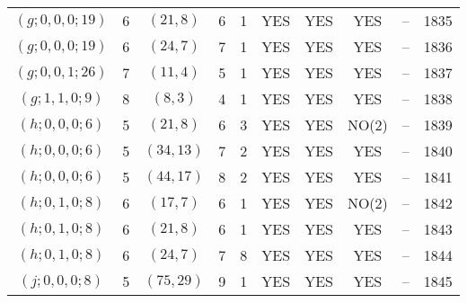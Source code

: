 \begin{longtable}{|c|c|c|c|c|c|c|c|c|c|}
$(g; 0, 0, 0; 19)$ & 6 & $(21, 8)$ & 6 & 1 & YES & YES & YES & -- & 1835\\
$(g; 0, 0, 0; 19)$ & 6 & $(24, 7)$ & 7 & 1 & YES & YES & YES & -- & 1836\\
$(g; 0, 0, 1; 26)$ & 7 & $(11, 4)$ & 5 & 1 & YES & YES & YES & -- & 1837\\
$(g; 1, 1, 0; 9)$ & 8 & $(8, 3)$ & 4 & 1 & YES & YES & YES & -- & 1838\\
$(h; 0, 0, 0; 6)$ & 5 & $(21, 8)$ & 6 & 3 & YES & YES & NO(2) & -- & 1839\\
$(h; 0, 0, 0; 6)$ & 5 & $(34, 13)$ & 7 & 2 & YES & YES & YES & -- & 1840\\
$(h; 0, 0, 0; 6)$ & 5 & $(44, 17)$ & 8 & 2 & YES & YES & YES & -- & 1841\\
$(h; 0, 1, 0; 8)$ & 6 & $(17, 7)$ & 6 & 1 & YES & YES & NO(2) & -- & 1842\\
$(h; 0, 1, 0; 8)$ & 6 & $(21, 8)$ & 6 & 1 & YES & YES & YES & -- & 1843\\
$(h; 0, 1, 0; 8)$ & 6 & $(24, 7)$ & 7 & 8 & YES & YES & YES & -- & 1844\\
$(j; 0, 0, 0; 8)$ & 5 & $(75, 29)$ & 9 & 1 & YES & YES & YES & -- & 1845
\end{longtable}
